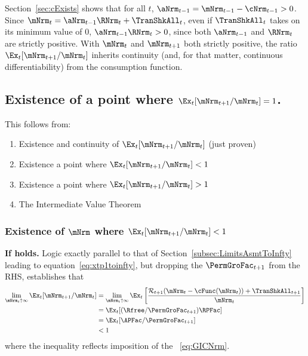 \documentclass[\econtexRoot/BufferStockTheory]{subfiles}
\begin{document}
Section~\ref{sec:cExists} shows that for all $t$, $\aNrm_{t-1} = {\mNrm}_{t-1} -  \cNrm_{t-1} > 0$.  Since ${\mNrm}_{t}= {\aNrm}_{t-1} \RNrm_{t} + \TranShkAll_{t}$, even if $\TranShkAll_{t}$ takes on its minimum value of 0, $\aNrm_{t-1} \RNrm_{t} > 0$, since both $\aNrm_{t-1}$ and $\RNrm_{t}$ are strictly positive.  With $\mNrm_{t}$ and $\mNrm_{t+1}$ both strictly positive, the ratio $\Ex_t [{\mNrm}_{t+1}/\mNrm_t]$ inherits continuity (and, for that matter, continuous differentiability) from the consumption function.

\subsection{Existence of a point where
  \texorpdfstring{$\Ex_t [{\mNrm}_{t+1}/\mNrm_t]=1$}
  {Ex-t[mNrm-{t+1}/mNrm-{t}]=1}.}

This follows from:
\begin{enumerate}
\item Existence and continuity of $\Ex_t [{\mNrm}_{t+1}/\mNrm_t]$ (just proven)
  \item Existence a point where $\Ex_t [{\mNrm}_{t+1}/\mNrm_t] < 1$
  \item Existence a point where $\Ex_t [{\mNrm}_{t+1}/\mNrm_t] > 1$
    \item The Intermediate Value Theorem
    \end{enumerate}

\subsubsection{Existence of \texorpdfstring{$\mNrm$}{m} where \texorpdfstring{$\Ex_t [{\mNrm}_{t+1}/\mNrm_t] < 1$}{E[m{t+1}/m{t}}}
    
\textbf{If {\RIC} holds.}  Logic exactly parallel to that of Section~\ref{subsec:LimitsAsmtToInfty} leading to equation~\eqref{eq:xtp1toinfty}, but dropping the $\PermGroFac_{t+1}$ from the RHS, establishes that
\begin{align}
  \lim_{\mNrm_{t} \uparrow \infty} \Ex_{t}[{\mNrm}_{t+1}/\mNrm_{t}]  & =   
                                                                       \lim_{\mNrm_{t} \uparrow \infty} 
                                                                       \Ex_{t}\left[\frac{{\mathcal{\mathcal{R}}}_{t+1}(\mNrm_{t}-\cFunc(\mNrm_{t}))+{\TranShkAll}_{t+1}}{\mNrm_{t}}\right] \notag 
  \\  & = \Ex_{t}[(\Rfree/{\PermGroFac}_{t+1})\RPFac]  \notag
  \\  & = \Ex_{t}[{\APFac}/{\PermGroFac}_{t+1}]  \label{eq:emgro}
  \\  & < 1 \notag
\end{align}
where the inequality reflects imposition of the \GICNrm~\eqref{eq:GICNrm}.
\end{document}
